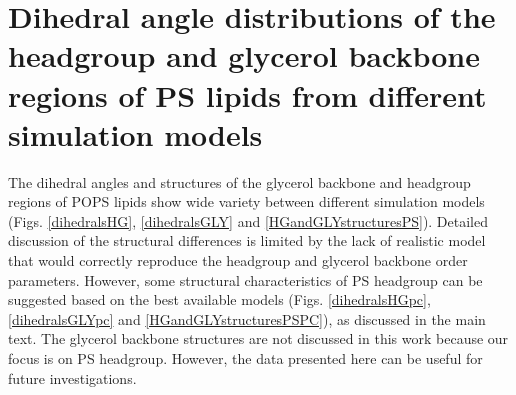 \documentclass[journal=jpcbfk]{achemso}
\begin{document}
\pagebreak
\section{Dihedral angle distributions of the headgroup and glycerol backbone
  regions of PS lipids from different simulation models}

The dihedral angles and structures of the glycerol backbone and headgroup regions of POPS lipids show
wide variety between different simulation models (Figs. \ref{dihedralsHG}, \ref{dihedralsGLY} and \ref{HGandGLYstructuresPS}).
Detailed discussion of the structural differences is limited by the lack of realistic model that would correctly reproduce the
headgroup and glycerol backbone order parameters. However, some structural characteristics
of PS headgroup can be suggested based on the best available models
(Figs. \ref{dihedralsHGpc}, \ref{dihedralsGLYpc} and \ref{HGandGLYstructuresPSPC}), as discussed in the main text.
The glycerol backbone structures are not discussed in this work because our focus is on PS headgroup.
However, the data presented here can be useful for future investigations.
\end{document}
